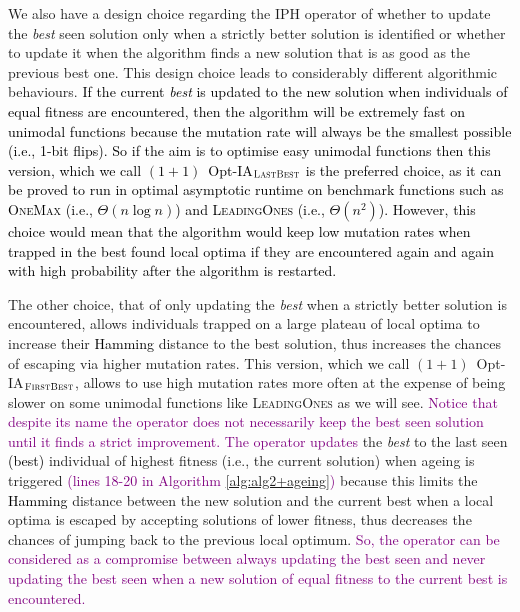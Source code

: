 \documentclass[lettersize,journal]{IEEEtran}
\newcommand{\rerev}[1]{\textcolor{purple}{#1}}
\newcommand{\rev}[1]{\textcolor{black}{#1}}
\begin{document}
{\color{black} We also have  a design choice regarding the IPH operator  of whether to update the {\it best} seen solution only when a strictly better solution is identified or whether to update it when the algorithm finds a new solution that is as good as the previous best one. 
This design choice leads to considerably different algorithmic behaviours.}
\textcolor{black}{If the current {\it best} is updated to the new solution when individuals of equal fitness are encountered,  then the algorithm will be extremely fast on unimodal functions because the mutation rate will always be the smallest possible (i.e., 1-bit flips). So if the aim is to optimise easy unimodal functions then this version, which we call $(1+1)$~Opt-IA$_{\textsc{LastBest}}$ is the preferred choice, as it can be proved to run in optimal asymptotic runtime on benchmark functions such as \textsc{OneMax} (i.e., $\Theta(n \log n)$) and \textsc{LeadingOnes} (i.e., $\Theta(n^2)$). However, this choice would mean that the algorithm would keep low mutation rates when trapped in the best found local optima if they are encountered again and again with high probability after the algorithm is restarted.}

The other choice, that of only updating the {\it best} when a strictly better solution is encountered, allows individuals trapped on a large plateau of local optima to increase their \rev{Hamming} distance to the best solution, thus increases the chances of escaping via higher mutation rates. This version, which we call $(1+1)$~Opt-IA$_{\textsc{FirstBest}}$, allows to use high mutation rates more often at the expense of being slower on some unimodal functions like \textsc{LeadingOnes} as we will see. \rerev{Notice that despite its name the operator does not necessarily keep the best seen solution until it finds a strict improvement. The operator updates} the {\it best} to the last seen \rev{(best)} individual of highest fitness (i.e., the current solution) when ageing is triggered \rerev{(lines 18-20 in Algorithm \ref{alg:alg2+ageing})}  because this limits the \rev{Hamming} distance between the new solution and the current best when a local optima is escaped by accepting solutions of lower fitness, thus decreases the chances of jumping back to the previous local optimum.
\rerev{So, the operator can be considered as a compromise between always updating the best seen and never updating the best seen when a new solution of equal fitness to the current best is encountered.}  
 	
\end{document}
